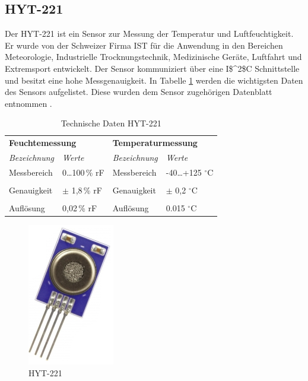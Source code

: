 \subsection{HYT-221}
\label{subsection_HYT221}
Der HYT-221 ist ein Sensor zur Messung der Temperatur und Luftfeuchtigkeit. Er wurde von der Schweizer Firma \ac{IST} für die Anwendung in den Bereichen Meteorologie, Industrielle Trocknungstechnik, Medizinische Geräte, Luftfahrt und Extremsport entwickelt. Der Sensor kommuniziert über eine \ac{I$^2$C} Schnittstelle und besitzt eine hohe Messgenauigkeit. In Tabelle \ref{Tabelle_Technische_Daten_HYT221}  werden die wichtigsten Daten des Sensors aufgelistet. Diese wurden dem Sensor zugehörigen Datenblatt entnommen \citep{Datenblatt_HYT221}.

\begin{table}[H]
\centering
\begin{tabular}{
llll
}
\toprule
\multicolumn{2}{p{7cm}}{\centering\textbf{Feuchtemessung}} & \multicolumn{2}{p{7cm}}{\centering\textbf{Temperaturmessung} } \\
\multicolumn{1}{p{4cm}}{\textit{Bezeichnung}} & \multicolumn{1}{p{3cm}}{\centering\textit{Werte} }&\multicolumn{1}{p{4cm}}{\textit{Bezeichnung}} & \multicolumn{1}{p{3cm}}{\centering\textit{Werte} }\\\midrule
Messbereich & 0\dots 100\,\% rF & Messbereich  & -40\dots +125 $^\circ\text{C}$ \\
&&&\\
Genauigkeit & $\pm$ 1,8\,\% rF& Genauigkeit & $\pm$ 0,2 $^\circ\text{C}$\\
&&&\\
Auflösung & 0,02\,\% rF & Auflösung & 0.015 $^\circ\text{C}$\\
\bottomrule
\end{tabular}
\caption{Technische Daten HYT-221 \citep{Datenblatt_HYT221}}
\label{Tabelle_Technische_Daten_HYT221}
\end{table}



\begin{figure}[!h] 
  \centering
     \includegraphics[scale=.4]{BilderAllgemein/HYT221.png}
  \caption{HYT-221 \citep{Bild_HYT221}}
  \label{Abb_HYT221}
\end{figure}

